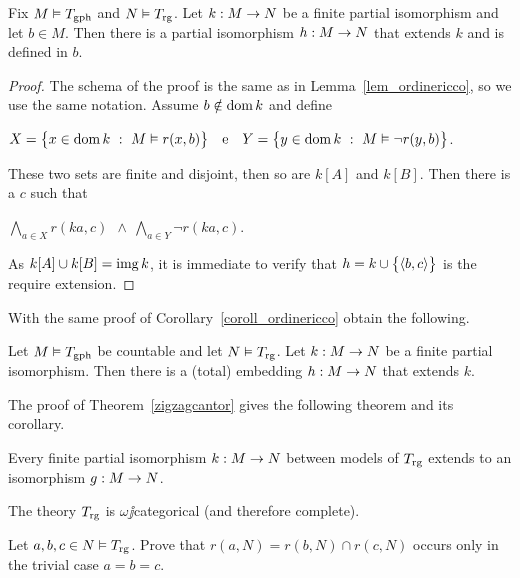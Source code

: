 \documentclass[creche.tex]{subfiles}
\begin{document}
\begin{lemma}\label{lem_graforicco}
Fix $M\models T_{\rm gph}$ and $N\models T_{\rm rg}$. Let $k:M\imp N$ be a finite partial isomorphism and let $b\in M$. Then there is a partial isomorphism $h:M\imp N$ that extends $k$ and is defined in $b$.
\end{lemma}
\begin{proof} The schema of the proof is the same as in Lemma~\ref{lem_ordinericco}, so we use the same notation. Assume $b\notin\dom k$ and define\medskip

\hfil$X=\big\{x\in\dom k\ :\ M\models r(x,b)\big\}\ \ \ \textrm{e}\ \ \ Y=\big\{y\in\dom k\ :\  M\models \neg r(y,b)\big\}$.\medskip

These two sets are finite and disjoint, then so are $k[A]$ and $k[B]$. Then there is a $c$ such that\medskip

\hfil$\displaystyle\bigwedge_{a\in X}r(ka,c)\ \ \wedge\ \bigwedge_{a\in Y}\neg r(ka,c)$.

As $k[A]\cup k[B]=\range k$, it is immediate to verify that $h=k\cup\big\{\<b,c\>\big\}$ is the require extension.
\end{proof}

With the same proof of Corollary~\ref{coroll_ordinericco} obtain the following.

\begin{corollary}\label{coroll_graforicco}
Let $M\models T_{\rm gph}$ be countable and let $N\models T_{\rm rg}$. Let $k:M\imp N$ be a finite partial isomorphism. Then there is a (total) embedding $h:M\imp N$ that extends $k$.\QED
\end{corollary}



The proof of Theorem~\ref{zigzagcantor} gives the following theorem and its corollary.

\begin{theorem}\label{gaomegacat}
Every finite partial isomorphism $k:M\imp N$ between models of $T_{\rm rg}$ extends to an isomorphism $g:M\imp N$.\QED
\end{theorem}

\begin{corollary}
The theory $T_{\rm rg}$ is $\omega\jj$categorical (and therefore complete).\QED
\end{corollary}

\begin{exercise}
Let $a,b,c\in N\models T_{\rm rg}$. Prove that $r(a,N)=r(b,N)\cap r(c,N)$ occurs only in the trivial case $a=b=c$.\QED
\end{exercise}
\end{document}
